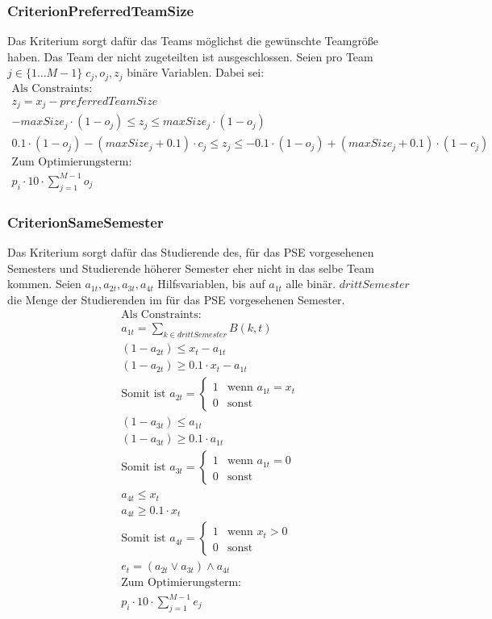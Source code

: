 \documentclass[parskip=full]{scrartcl}
\begin{document}
\subsubsection{CriterionPreferredTeamSize}
Das Kriterium sorgt dafür das Teams möglichst die gewünschte Teamgröße haben.
Das Team der nicht zugeteilten ist ausgeschlossen. Seien pro Team $j \in \{1\ldots M-1 \} \; c_j,o_j,z_j$ binäre Variablen.
Dabei sei: 
\begin{gather*}
\text{Als Constraints: }\\
z_j =x_j - preferredTeamSize\\
-maxSize_j \cdot (1-o_j) \le z_j \le maxSize_j \cdot (1-o_j)\\
0.1\cdot(1-o_j) - (maxSize_j + 0.1)\cdot c_j \le z_j \le -0.1\cdot
(1-o_j)+(maxSize_j +0.1)\cdot(1-c_j)\\
\text{Zum Optimierungsterm:} \\
 p_i \cdot 10 \cdot \sum_{j = 1}^{M-1}
o_j
\end{gather*}
\subsubsection{CriterionSameSemester}
Das Kriterium sorgt dafür das Studierende des, für das PSE vorgesehenen
Semesters und Studierende höherer Semester eher nicht in das selbe Team kommen. 
Seien $a_{1t},a_{2t},a_{3t},a_{4t}$ Hilfsvariablen, bis auf $a_{1t}$ alle binär.
$drittSemester$ die Menge der Studierenden im für das PSE vorgesehenen Semester.
\begin{gather*}
\text{Als Constraints:} \\
a_{1t} = \sum_{k \in drittSemester} B(k,t) \\
(1 - a_{2t}) \le x_t - a_{1t} \\ (1 - a_{2t}) \ge 0.1 \cdot x_t - a_{1t} \\
\text{Somit ist } a_{2t} = \begin{cases}
    1 & \text{wenn $a_{1t} = x_t$} \\
    0 & \text{sonst} 
    \end{cases}\\
(1-a_{3t}) \le a_{1t} \\
(1-a_{3t}) \ge 0.1 \cdot a_{1t}\\
\text{Somit ist } a_{3t} = \begin{cases}
    1 & \text{wenn $a_{1t} = 0$} \\
    0 & \text{sonst} 
    \end{cases}\\
a_{4t} \le x_t \\
a_{4t} \ge 0.1 \cdot x_t \\
\text{Somit ist } a_{4t} = \begin{cases}
    1 & \text{wenn $x_t > 0$} \\
    0 & \text{sonst} 
    \end{cases}\\
e_t = (a_{2t} \vee a_{3t}) \wedge a_{4t}\\
\text{Zum Optimierungsterm:} \\
p_i \cdot 10 \cdot \sum_{j=1 }^{M-1} e_j
\end{gather*}
\end{document}
